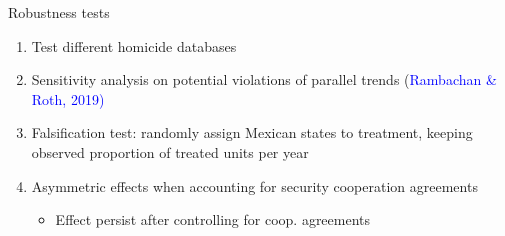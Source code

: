 \documentclass{beamer}
\begin{document}
\begin{frame}[label=robustness]{Robustness tests}
\begin{enumerate}
 		  \setlength\itemsep{1em}   
	\item Test different homicide databases  \hyperlink{diff_datasets}{} %
	\item Sensitivity analysis on potential violations of parallel trends (\textcolor{blue}{Rambachan \& Roth, 2019)}   \hyperlink{sensitivity_analysis}{} 
	\item Falsification test: randomly assign Mexican states to treatment, keeping observed proportion of treated units per year  \hyperlink{falsification}{}   
	\item Asymmetric effects when accounting for security cooperation agreements \hyperlink{mando_unico}{} 
		\begin{itemize}
		\item Effect persist after controlling for coop. agreements \hyperlink{mando_unico_control}{} 
		\end{itemize}
\end{enumerate}   

\end{frame}
\end{document}
